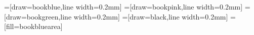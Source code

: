 \usepackage{fourier}
\usetikzlibrary{arrows.meta}
\usetikzlibrary{calc}
\tikzset{>=latex}
=[draw=bookblue,line width=0.2mm]
=[draw=bookpink,line width=0.2mm]
=[draw=bookgreen,line width=0.2mm]
=[draw=black,line width=0.2mm]
=[fill=bookbluearea]
